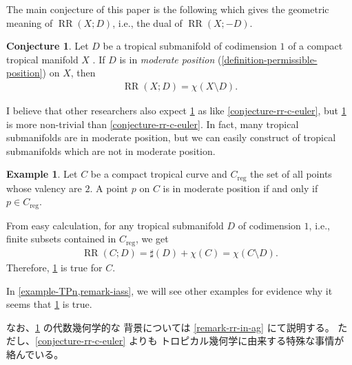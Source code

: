 \documentclass[a4paper,dvipdfmx,reqno,12pt]{amsart}
\theoremstyle{definition}
\newtheorem{example}[theorem]{Example}
\newtheorem{conjecture}[theorem]{Conjecture}
\newcommand{\opn}[1]{\operatorname{#1}}
\numberwithin{equation}{section}
\begin{document}
The main conjecture of this paper is the following 
which gives
the geometric meaning of $\opn{RR}(X;D)$, i.e.,
the dual of $\opn{RR}(X;-D)$.

\begin{conjecture}
\label{conjecture-rr-euler}
Let $D$ be a tropical submanifold of codimension 
$1$ of a compact tropical manifold $X$
\cite[Definition 2.14]{demedrano2023chern}.
If $D$ is in \emph{moderate position}
(\cref{definition-permissible-position}) on $X$,
then 
\begin{align}
\opn{RR}(X;D)=\chi(X\setminus D).
\end{align}
\end{conjecture}
I believe that other researchers also expect
\cref{conjecture-rr-euler} as like
\cref{conjecture-rr-c-euler},
but \cref{conjecture-rr-euler} is more non-trivial than
\cref{conjecture-rr-c-euler}.
In fact, many tropical submanifolds are in moderate position,
but we can easily construct of tropical submanifolds
which are not in moderate position.

\begin{example}
\label{example-permissible-point}
Let $C$ be a compact tropical curve 
and $C_{\mathrm{reg}}$ the set of all
points whose valency are $2$.
A point $p$ on $C$ is in moderate position
if and only if $p\in C_{\mathrm{reg}}$.

From easy calculation, for any 
tropical submanifold $D$ of codimension $1$, i.e.,
finite subsets contained in $C_{\mathrm{reg}}$, we get
\begin{align}
\opn{RR}(C;D)=\sharp (D)+ \chi(C)
=\chi(C\setminus D).
\end{align}
Therefore, \cref{conjecture-rr-euler} is true
for $C$.
\end{example}
In \cref{example-TPn,remark-iass},
we will see other examples for evidence 
why it seems that \cref{conjecture-rr-euler}
is true.

なお、\cref{conjecture-rr-euler} の代数幾何学的な
背景については \cref{remark-rr-in-ag} にて説明する。
ただし、\cref{conjecture-rr-c-euler} よりも
トロピカル幾何学に由来する特殊な事情が絡んでいる。
\end{document}

